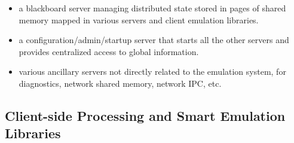 \begin{description}
\begin{itemize}
\item a blackboard server managing distributed state stored in pages of
shared memory mapped in various servers and client emulation libraries.

\item a configuration/admin/startup server that starts all the other
servers and provides centralized access to global information.

\item various ancillary servers not directly related to the emulation
system, for diagnostics, network shared memory, network IPC, etc.

\end{itemize}
\end{description}



\subsection{Client-side Processing and Smart Emulation Libraries}

